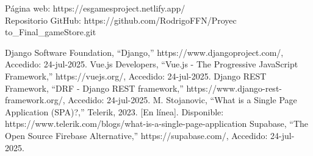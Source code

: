 \documentclass[conference]{IEEEtran}
\begin{document}
Página web: https://esgamesproject.netlify.app/\\

Repositorio GitHub: https://github.com/RodrigoFFN/Proyec\\to\_Final\_gameStore.git

\begin{thebibliography}{00}
 Django Software Foundation, “Django,” https://www.djangoproject.com/, Accedido: 24-jul-2025.
 Vue.js Developers, “Vue.js - The Progressive JavaScript Framework,” https://vuejs.org/, Accedido: 24-jul-2025.
 Django REST Framework, “DRF - Django REST framework,” https://www.django-rest-framework.org/, Accedido: 24-jul-2025.
 M. Stojanovic, “What is a Single Page Application (SPA)?,” Telerik, 2023. [En línea]. Disponible: https://www.telerik.com/blogs/what-is-a-single-page-application
 Supabase, “The Open Source Firebase Alternative,” https://supabase.com/, Accedido: 24-jul-2025.

\end{thebibliography}
\end{document}
